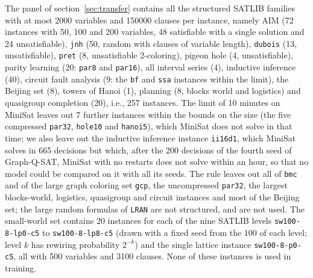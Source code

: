 \documentclass[11pt,a4paper]{article}
\newcommand{\code}[1]{\texttt{\def\_{\textunderscore\allowbreak}#1}}
\begin{document}
\smallskip
\noindent
The panel of section~\ref{sec:transfer} contains all the structured SATLIB
families with at most 2000 variables and 150000 clauses per instance, namely
AIM (72 instances with 50, 100 and 200 variables, 48 satisfiable with a single
solution and 24 unsatisfiable), \code{jnh} (50, random with clauses of variable
length), \code{dubois} (13, unsatisfiable), \code{pret} (8, unsatisfiable
2-coloring), pigeon hole (4, unsatisfiable), parity learning (20: \code{par8}
and \code{par16}), all interval series (4),
inductive inference (40), circuit fault analysis (9: the \code{bf} and
\code{ssa} instances within the limit), the Beijing set (8), towers of Hanoi
(1), planning (8, blocks world and logistics) and quasigroup completion (20),
i.e., 257 instances. The limit of 10 minutes on MiniSat leaves out 7 further
instances within the bounds on the size (the five compressed \code{par32},
\code{hole10} and \code{hanoi5}), which MiniSat does not solve in that time;
we also leave out the inductive inference instance \code{ii16d1}, which MiniSat
solves in 665 decisions but which, after the 200 decisions of the fourth seed
of Graph-Q-SAT, MiniSat with no restarts does not solve within an hour, so that
no model could be compared on it with all its seeds.
The rule leaves out all of \code{bmc} and of the large graph coloring set
\code{gcp}, the uncompressed \code{par32}, the largest blocks-world, logistics,
quasigroup and circuit instances and most of the Beijing set; the large random
formulas of \code{LRAN} are not structured, and are not used. The small-world
set contains 20 instances for each of the nine SATLIB levels
\code{sw100-8-lp0-c5} to \code{sw100-8-lp8-c5} (drawn with a fixed seed from the
100 of each level; level $k$ has rewiring probability $2^{-k}$) and the single
lattice instance \code{sw100-8-p0-c5}, all with 500 variables and 3100 clauses.
None of these instances is used in training.
\end{document}
